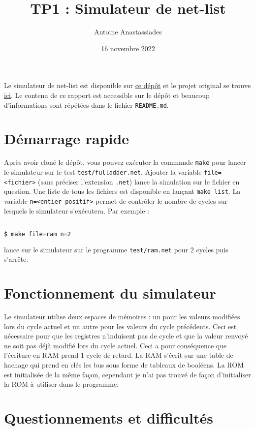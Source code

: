 \documentclass{article}
\title{TP1 : Simulateur de net-list}
\author{Antoine Anastassiades}
\date{16 novembre 2022}
\begin{document}
\maketitle

Le simulateur de net-list est disponible sur \href{https://github.com/a-ananas/sysnum2022_tp1}{ce dépôt} et le projet original se trouve \href{https://github.com/hbens/sysnum-2022/tree/master/tp1}{ici}. Le contenu de ce rapport est accessible sur le dépôt et beaucoup d'informations sont répétées dans le fichier \texttt{README.md}.

\section{Démarrage rapide}
Après avoir cloné le dépôt, vous pouvez exécuter la commande \texttt{make} pour lancer le simulateur sur le test \texttt{test/fulladder.net}. Ajouter la variable \texttt{file=<fichier>} (sans préciser l'extension \texttt{.net}) lance la simulation sur le fichier en question. Une liste de tous les fichiers est disponible en lançant \texttt{make list}. La variable \texttt{n=<entier positif>} permet de contrôler le nombre de cycles sur lesquels le simulateur s'exécutera. Par exemple :
\begin{lstlisting}[language=Bash]

$ make file=ram n=2

\end{lstlisting}

lance sur le simulateur sur le programme \texttt{test/ram.net} pour 2 cycles puis s'arrête.

\section{Fonctionnement du simulateur}

Le simulateur utilise deux espaces de mémoires : un pour les valeurs modifiées lors du cycle actuel et un autre pour les valeurs du cycle précédents. Ceci est nécessaire pour que les registres n'induisent pas de cycle et que la valeur renvoyé ne soit pas déjà modifié lors du cycle actuel. Ceci a pour conséquence que l'écriture en RAM prend 1 cycle de retard. La RAM s'écrit sur une table de hachage qui prend en clés les bus sous forme de tableaux de booléens. La ROM est initialisée de la même façon, cependant je n'ai pas trouvé de façon d'initialiser la ROM à utiliser dans le programme.

\section{Questionnements et difficultés}
\end{document}
